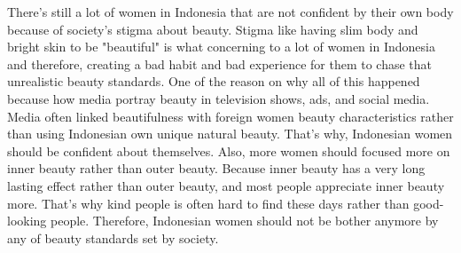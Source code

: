 \documentclass[12pt]{article}
\begin{document}
    There's still a lot of women in Indonesia that are not confident by their
    own body because of society's stigma about beauty. Stigma like having slim
    body and bright skin to be "beautiful" is what concerning to a lot of women 
    in Indonesia and therefore, creating a bad habit and bad experience for them
    to chase that unrealistic beauty standards. One of the reason on why all of
    this happened because how media portray beauty in television shows, ads, and
    social media. Media often linked beautifulness with foreign women beauty
    characteristics rather than using Indonesian own unique natural beauty.
    That's why, Indonesian women should be confident about themselves.
    Also, more women should focused more on inner beauty rather than outer
    beauty. Because inner beauty has a very long lasting effect rather than outer
    beauty, and most people appreciate inner beauty more. That's why kind people 
    is often hard to find these days rather than good-looking people. 
    Therefore, Indonesian women should not be bother anymore by any of beauty
    standards set by society.

    \pagebreak
    \nocite{
        fardoulyNegativeComparisonsOne2015,
        fimela.comIniAlasanMengapa2018,
        InnerBeautyLebih,
        islameyWacanaStandarKecantikan2020,
        kumparanwomanBagaimanaCaraMeningkatkan2019,
        maleSurvei84Persen,
        mediaTakHarusKulit2021,
        oakesComplicatedTruthSocial,
        obioraDarkSideSocial0100,
        prianti2013indonesian,
        puspitasariDiscourseShiftingLocal2020,
        rachmanBalancingOuterInner2013,
        ratnaningtiasCantikDiInstagram2018,
        rizkiyahSTRATEGICOPINGPEREMPUAN2020,
        schmalzriedInnerBeautyFriendshipHypothesis2013,
        wirasariKAJIANKECANTIKANKAUM2016,
        wisnubrataCaraMemancarkanInner2020}
    \printbibliography
\end{document}
